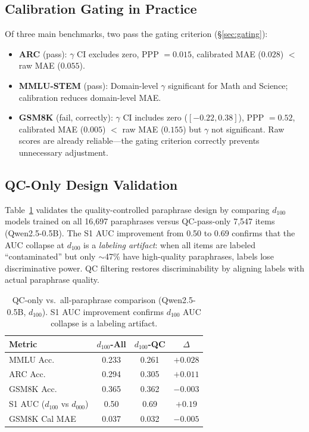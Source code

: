 \documentclass[11pt,a4paper]{article}
\begin{document}
\subsection{Calibration Gating in Practice}

Of three main benchmarks, two pass the gating criterion (\S\ref{sec:gating}):

\begin{itemize}[nosep,leftmargin=*]
\item \textbf{ARC} (pass): $\gamma$ CI excludes zero, PPP $= 0.015$, calibrated MAE ($0.028$) $<$ raw MAE ($0.055$).
\item \textbf{MMLU-STEM} (pass): Domain-level $\gamma$ significant for Math and Science; calibration reduces domain-level MAE.
\item \textbf{GSM8K} (fail, correctly): $\gamma$ CI includes zero ($[{-0.22, 0.38}]$), PPP $= 0.52$, calibrated MAE ($0.005$) $<$ raw MAE ($0.155$) but $\gamma$ not significant. Raw scores are already reliable---the gating criterion correctly prevents unnecessary adjustment.
\end{itemize}

\subsection{QC-Only Design Validation}

Table~\ref{tab:qc_only} validates the quality-controlled paraphrase design by comparing $d_{100}$ models trained on all 16,697 paraphrases versus QC-pass-only 7,547 items (Qwen2.5-0.5B). The S1 AUC improvement from 0.50 to 0.69 confirms that the AUC collapse at $d_{100}$ is a \emph{labeling artifact}: when all items are labeled ``contaminated'' but only $\sim$47\% have high-quality paraphrases, labels lose discriminative power. QC filtering restores discriminability by aligning labels with actual paraphrase quality.

\begin{table}[t]
\centering
\small
\caption{QC-only vs.\ all-paraphrase comparison (Qwen2.5-0.5B, $d_{100}$). S1 AUC improvement confirms $d_{100}$ AUC collapse is a labeling artifact.}
\label{tab:qc_only}
\begin{tabular}{lccc}
\toprule
\textbf{Metric} & \textbf{$d_{100}$-All} & \textbf{$d_{100}$-QC} & \textbf{$\Delta$} \\
\midrule
MMLU Acc. & 0.233 & 0.261 & $+0.028$ \\
ARC Acc. & 0.294 & 0.305 & $+0.011$ \\
GSM8K Acc. & 0.365 & 0.362 & $-0.003$ \\
S1 AUC ($d_{100}$ vs $d_{000}$) & 0.50 & 0.69 & $+0.19$ \\
GSM8K Cal MAE & 0.037 & 0.032 & $-0.005$ \\
\bottomrule
\end{tabular}
\end{table}
\end{document}
